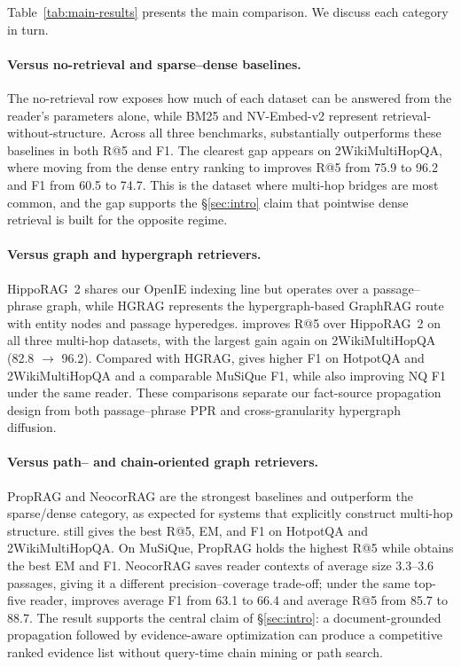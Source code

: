 Table~\ref{tab:main-results} presents the main comparison. We discuss
each category in turn.

\paragraph{Versus no-retrieval and sparse--dense baselines.}
The no-retrieval row exposes how much of each dataset can be answered
from the reader's parameters alone, while BM25 and NV-Embed-v2
represent retrieval-without-structure. Across all three benchmarks,
\methodname{} substantially outperforms these baselines in both R@5
and F1. The clearest gap appears on 2WikiMultiHopQA, where moving from
the dense entry ranking to \methodname{} improves R@5 from 75.9 to
96.2 and F1 from 60.5 to 74.7. This is the dataset where multi-hop
bridges are most common, and the gap supports the
\S\ref{sec:intro} claim that pointwise dense retrieval is built for
the opposite regime.

\paragraph{Versus graph and hypergraph retrievers.}
HippoRAG~2 shares our OpenIE indexing line but operates over a
passage--phrase graph, while HGRAG represents the hypergraph-based
GraphRAG route with entity nodes and passage hyperedges. \methodname{}
improves R@5 over HippoRAG~2 on all three multi-hop datasets, with the
largest gain again on 2WikiMultiHopQA (82.8 $\to$ 96.2). Compared with
HGRAG, \methodname{} gives higher F1 on HotpotQA and 2WikiMultiHopQA
and a comparable MuSiQue F1, while also improving NQ F1 under the same
reader. These comparisons separate our fact-source propagation design
from both passage--phrase PPR and cross-granularity hypergraph
diffusion.

\paragraph{Versus path-- and chain-oriented graph retrievers.}
PropRAG and NeocorRAG are the strongest baselines and outperform the
sparse/dense category, as expected for systems that explicitly
construct multi-hop structure. \methodname{} still gives the best R@5,
EM, and F1 on HotpotQA and 2WikiMultiHopQA. On MuSiQue, PropRAG holds
the highest R@5 while \methodname{} obtains the best EM and F1.
NeocorRAG saves reader contexts of average size 3.3--3.6 passages,
giving it a different precision--coverage trade-off; under the same
top-five reader, \methodname{} improves average F1 from 63.1 to 66.4
and average R@5 from 85.7 to 88.7. The result supports the central
claim of \S\ref{sec:intro}: a document-grounded propagation followed
by evidence-aware optimization can produce a competitive ranked
evidence list without query-time chain mining or path search.

